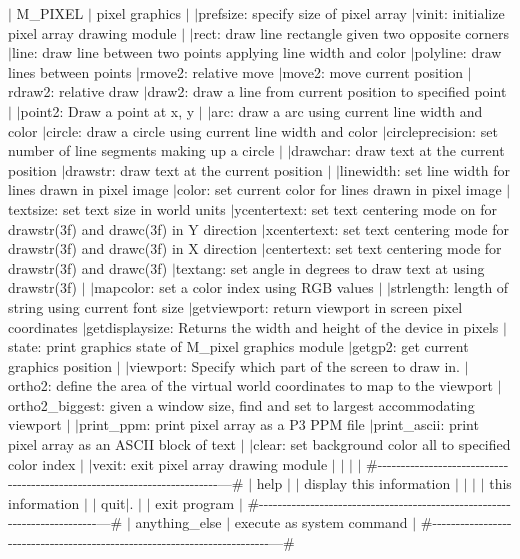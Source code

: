 $\vert$ M\+\_\+\+P\+I\+X\+EL $\vert$ pixel graphics $\vert$ $\vert$prefsize\+: specify size of pixel array $\vert$vinit\+: initialize pixel array drawing module $\vert$ $\vert$rect\+: draw line rectangle given two opposite corners $\vert$line\+: draw line between two points applying line width and color $\vert$polyline\+: draw lines between points $\vert$rmove2\+: relative move $\vert$move2\+: move current position $\vert$rdraw2\+: relative draw $\vert$draw2\+: draw a line from current position to specified point $\vert$ $\vert$point2\+: Draw a point at x, y $\vert$ $\vert$arc\+: draw a arc using current line width and color $\vert$circle\+: draw a circle using current line width and color $\vert$circleprecision\+: set number of line segments making up a circle $\vert$ $\vert$drawchar\+: draw text at the current position $\vert$drawstr\+: draw text at the current position $\vert$ $\vert$linewidth\+: set line width for lines drawn in pixel image $\vert$color\+: set current color for lines drawn in pixel image $\vert$textsize\+: set text size in world units $\vert$ycentertext\+: set text centering mode on for drawstr(3f) and drawc(3f) in Y direction $\vert$xcentertext\+: set text centering mode for drawstr(3f) and drawc(3f) in X direction $\vert$centertext\+: set text centering mode for drawstr(3f) and drawc(3f) $\vert$textang\+: set angle in degrees to draw text at using drawstr(3f) $\vert$ $\vert$mapcolor\+: set a color index using R\+GB values $\vert$ $\vert$strlength\+: length of string using current font size $\vert$getviewport\+: return viewport in screen pixel coordinates $\vert$getdisplaysize\+: Returns the width and height of the device in pixels $\vert$state\+: print graphics state of M\+\_\+pixel graphics module $\vert$getgp2\+: get current graphics position $\vert$ $\vert$viewport\+: Specify which part of the screen to draw in. $\vert$ortho2\+: define the area of the virtual world coordinates to map to the viewport $\vert$ortho2\+\_\+biggest\+: given a window size, find and set to largest accommodating viewport $\vert$ $\vert$print\+\_\+ppm\+: print pixel array as a P3 P\+PM file $\vert$print\+\_\+ascii\+: print pixel array as an A\+S\+C\+II block of text $\vert$ $\vert$clear\+: set background color all to specified color index $\vert$ $\vert$vexit\+: exit pixel array drawing module $\vert$ $\vert$ $\vert$ $\vert$ \#-\/-\/-\/-\/-\/-\/-\/-\/-\/-\/-\/-\/-\/-\/-\/-\/-\/-\/-\/-\/-\/-\/-\/-\/-\/-\/-\/-\/-\/-\/-\/-\/-\/-\/-\/-\/-\/-\/-\/-\/-\/-\/-\/-\/-\/-\/-\/-\/-\/-\/-\/-\/-\/-\/-\/-\/-\/-\/-\/-\/-\/-\/-\/-\/-\/-\/-\/-\/-\/-\/-\/-\/-\/---\# $\vert$ help $\vert$ $\vert$ display this information $\vert$ $\vert$ $\vert$ $\vert$ this information $\vert$ $\vert$ quit$\vert$. $\vert$ $\vert$ exit program $\vert$ \#-\/-\/-\/-\/-\/-\/-\/-\/-\/-\/-\/-\/-\/-\/-\/-\/-\/-\/-\/-\/-\/-\/-\/-\/-\/-\/-\/-\/-\/-\/-\/-\/-\/-\/-\/-\/-\/-\/-\/-\/-\/-\/-\/-\/-\/-\/-\/-\/-\/-\/-\/-\/-\/-\/-\/-\/-\/-\/-\/-\/-\/-\/-\/-\/-\/-\/-\/-\/-\/-\/-\/-\/-\/---\# $\vert$ anything\+\_\+else $\vert$ execute as system command $\vert$ \#-\/-\/-\/-\/-\/-\/-\/-\/-\/-\/-\/-\/-\/-\/-\/-\/-\/-\/-\/-\/-\/-\/-\/-\/-\/-\/-\/-\/-\/-\/-\/-\/-\/-\/-\/-\/-\/-\/-\/-\/-\/-\/-\/-\/-\/-\/-\/-\/-\/-\/-\/-\/-\/-\/-\/-\/-\/-\/-\/-\/-\/-\/-\/-\/-\/-\/-\/-\/-\/-\/-\/-\/-\/---\#

